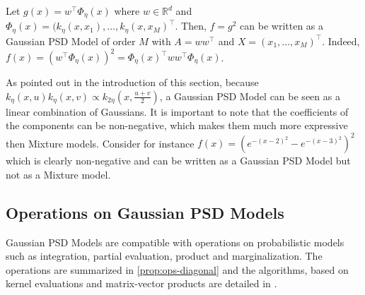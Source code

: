 \begin{example}\label{ex:sq-linear-model}
Let $g(x) = w^\top \Phi_\eta(x)$ where $w\in\mathbb R^d$ and $\Phi_\eta(x)= (k_\eta(x, x_1), \ldots, k_\eta(x, x_M)^\top $. Then, $f=g^2$ can be written as a Gaussian PSD Model of order $M$ with $A=ww^\top $ and $X = (x_1, \ldots, x_M)^\top $. Indeed, $f(x) = (w^\top \Phi_\eta(x))^2 = \Phi_\eta(x)^\top ww^\top \Phi_\eta(x)$.
\end{example}

\noindent As pointed out in the introduction of this section, because $k_\eta(x, u)k_\eta(x, v)\propto k_{2\eta}(x, \frac{u+v}{2})$, a Gaussian PSD Model can be seen as a linear combination of Gaussians. It is important to note that the coefficients of the components can be non-negative, which makes them much more expressive then Mixture models. Consider for instance $f(x) = (e^{-(x-2)^2} - e^{-(x-3)^2})^2$ which is clearly non-negative and can be written as a Gaussian PSD Model but not as a Mixture model.

\subsection{Operations on Gaussian PSD Models}
Gaussian PSD Models are compatible with operations on probabilistic models such as integration, partial evaluation, product and marginalization. The operations are summarized in \cref{prop:ops-diagonal} and the algorithms, based on kernel evaluations and matrix-vector products are detailed in \cite{ciliberto2021}.

